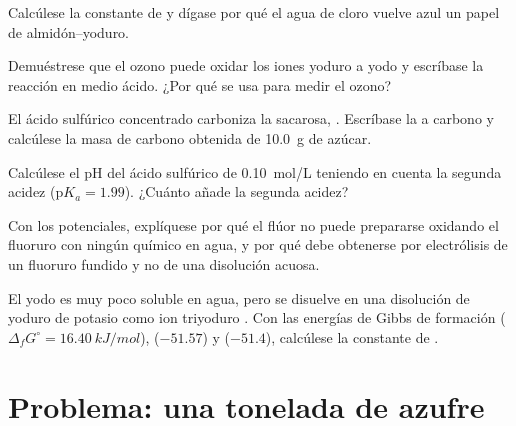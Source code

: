 \begin{exercise}[$\star\star$]\label{exo:b1:p-block-16-18:7}
Calcúlese la constante de  y dígase por qué el
agua de cloro vuelve azul un papel de almidón--yoduro.
\end{exercise}

\begin{exercise}[$\star\star$]\label{exo:b1:p-block-16-18:8}
Demuéstrese que el ozono puede oxidar los iones yoduro a yodo y
escríbase la reacción en medio ácido. ¿Por qué se usa para medir el
ozono?
\end{exercise}

\begin{exercise}[$\star\star$]\label{exo:b1:p-block-16-18:9}
El ácido sulfúrico concentrado carboniza la sacarosa, .
Escríbase la  a carbono y calcúlese la masa de carbono
obtenida de \qty{10.0}{g} de azúcar.
\end{exercise}

\begin{exercise}[$\star\star\star$]\label{exo:b1:p-block-16-18:10}
Calcúlese el pH del ácido sulfúrico de \qty{0.10}{mol/L} teniendo en
cuenta la segunda acidez ($\mathrm{p}K_a = 1.99$). ¿Cuánto añade la
segunda acidez?
\end{exercise}

\begin{exercise}[$\star\star\star$]\label{exo:b1:p-block-16-18:11}
Con los potenciales, explíquese por qué el flúor no puede prepararse
oxidando el fluoruro con ningún  químico en agua, y por qué debe
obtenerse por electrólisis de un fluoruro fundido y no de una disolución
acuosa.
\end{exercise}

\begin{exercise}[$\star\star\star$]\label{exo:b1:p-block-16-18:12}
El yodo es muy poco soluble en agua, pero se disuelve en una disolución
de yoduro de potasio como ion triyoduro . Con las energías de
Gibbs de formación
 ($\Delta_f G^\circ = \qty{16.40}{kJ/mol}$),  ($-51.57$)
y  ($-51.4$), calcúlese la constante de .
\end{exercise}

\section{Problema: una tonelada de azufre}

